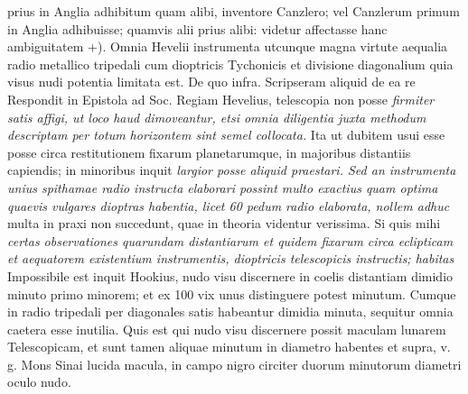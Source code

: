  prius in Anglia\protect{} adhibitum quam alibi, inventore Canzlero\protect{}; vel Canzlerum\protect{} primum in Anglia\protect{} adhibuisse; quamvis alii prius alibi: videtur affectasse hanc ambiguitatem +). Omnia Hevelii\protect{} instrumenta\protect{} utcunque magna virtute aequalia radio metallico tripedali cum dioptricis Tychonicis et divisione diagonalium\protect{} quia visus nudi potentia limitata est. De quo infra. Scripseram aliquid de ea re  Respondit in Epistola ad Soc. Regiam\protect{} Hevelius\protect{}, telescopia\protect{} non posse \textit{firmiter satis affigi, ut loco haud dimoveantur, etsi omnia diligentia juxta methodum descriptam per totum horizontem sint semel collocata.} Ita ut dubitem usui esse posse circa restitutionem fixarum planetarumque, in majoribus distantiis capiendis; in minoribus inquit \textit{largior posse aliquid praestari. Sed an instrumenta unius spithamae radio instructa elaborari possint multo exactius quam optima quaevis vulgares dioptras\protect{} habentia, licet 60 pedum radio elaborata, nollem adhuc}  multa in praxi non succedunt, quae in theoria videntur verissima. Si quis mihi \textit{certas observationes quarundam distantiarum et quidem fixarum circa eclipticam\protect{} et aequatorem existentium instrumentis, dioptricis telescopicis\protect{} instructis; habitas}  Impossibile est inquit Hookius\protect{}, nudo visu discernere in coelis distantiam dimidio minuto primo minorem; et ex 100 vix unus distinguere potest minutum. Cumque in radio tripedali per diagonales satis habeantur dimidia minuta, sequitur omnia caetera esse inutilia. Quis est qui nudo visu discernere possit maculam lunarem Telescopicam, et sunt tamen aliquae minutum in diametro habentes et supra, v. g. Mons Sinai\protect{} lucida macula, in campo nigro circiter duorum minutorum diametri oculo nudo. 
